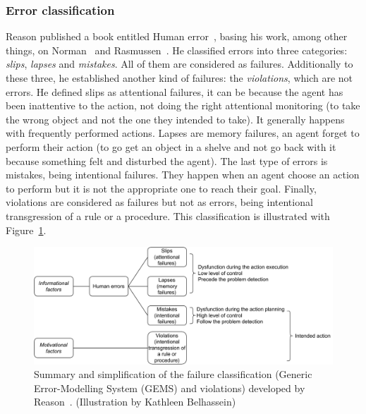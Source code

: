 \documentclass[a4paper,11pt,twoside]{StyleThese}
\begin{document}
\subsubsection{Error classification}
Reason published a book entitled Human error~\cite{reason_1990_human}, basing his work, among other things, on Norman~\cite{norman_1981_categorization} and Rasmussen~\cite{rasmussen_1982_human}. He classified errors into three categories: \textit{slips}, \textit{lapses} and \textit{mistakes}. All of them are considered as failures. Additionally to these three, he established another kind of failures: the \textit{violations}, which are not errors. He defined slips as attentional failures, \ie it can be because the agent has been inattentive to the action, not doing the right attentional monitoring (\eg to take the wrong object and not the one they intended to take). It generally happens with frequently performed actions. Lapses are memory failures, \ie an agent forget to perform their action (\eg to go get an object in a shelve and not go back with it because something felt and disturbed the agent). The last type of errors is mistakes, being intentional failures. They happen when an agent choose an action to perform but it is not the appropriate one to reach their goal. Finally, violations are considered as failures but not as errors, being intentional transgression of a rule or a procedure. This classification is illustrated with Figure~\ref{chap1:fig:err}.

 \begin{figure}[!ht]
 	\includegraphics[width=\linewidth]{figures/chapter1/reason-errors.pdf}
 	\caption{Summary and simplification of the failure classification (Generic Error-Modelling System (GEMS) and violations) developed by Reason~\cite{reason_1990_human}. (Illustration by Kathleen Belhassein)}
 	\label{chap1:fig:err}
 \end{figure}
\end{document}
